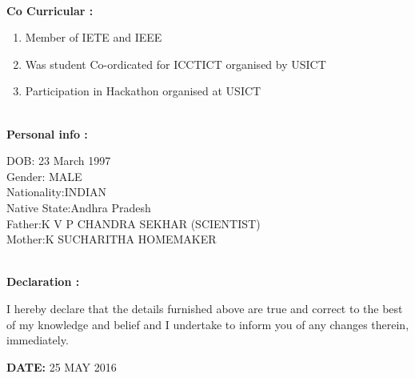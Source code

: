 \documentclass{article}
\begin{document}
\leavevmode\\
	\textbf{Co Curricular :}
	\begin{enumerate}
		\item Member of IETE and IEEE
		\item Was student Co-ordicated for ICCTICT organised by USICT
		\item Participation in Hackathon organised at USICT
		
		\end{enumerate}
\leavevmode
\\
\textbf{Personal info :}
		\begin{center}
			DOB: 23 March 1997\\
			Gender: MALE\\
			Nationality:INDIAN\\
			Native State:Andhra Pradesh\\
		    Father:K V P  CHANDRA SEKHAR (SCIENTIST)\\
	     	Mother:K SUCHARITHA   HOMEMAKER\\
		
		\end{center}
\leavevmode
\\
\leavevmode
\textbf{Declaration :}
	\begin{flushleft}
		I hereby declare that the details furnished above are true and correct to the best of my knowledge
		and belief and I undertake to inform you of any changes therein, immediately.
	\end{flushleft}	 

\begin{flushright}
	\textbf{DATE:} 25 MAY 2016
\end{flushright}
\end{document}
